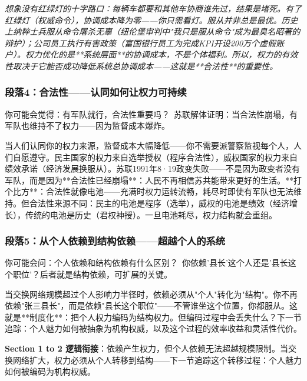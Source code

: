 \documentclass[a4paper,12pt]{book}
\newenvironment{motivation}{\begin{tcolorbox}[colback=gray!10,colframe=gray!60,title=\textit{本章动机},fonttitle=\bfseries,arc=0mm,leftrule=3mm]\small\itshape}{\end{tcolorbox}}
\begin{document}
\begin{motivation}
\begin{motivation}
\begin{motivation}
想象没有红绿灯的十字路口：每辆车都要和其他车协商谁先过，结果是堵死。有了红绿灯（权威命令），协调成本降为零——你只需看灯。服从并非总是最优。历史上纳粹士兵服从命令屠杀无辜（纽伦堡审判中"我只是服从命令"成为最臭名昭著的辩护）；公司员工执行有害政策（富国银行员工为完成KPI开设200万个虚假账户）。权力优化的是**系统层面**的协调成本，不是个体福利。所以，权力的有效性取决于它能否成功降低系统总协调成本——这就是**合法性**的重要性。

	\subsubsection*{段落4：合法性——认同如何让权力可持续}

	\begin{tcolorbox}[colback=yellow!5, title=\textit{读者行为预测}]
		你可能会觉得：有军队就行，合法性重要吗？\ 苏联解体证明：当合法性崩塌，有军队也维持不了权力——因为监督成本爆炸。
	\end{tcolorbox}

当人们认同你的权力来源，监督成本大幅降低——你不需要派警察监视每个人，人们自愿遵守。民主国家的权力来自选举授权（程序合法性），威权国家的权力来自绩效承诺（经济发展换服从）。苏联1991年8·19政变失败——不是因为政变者没有军队，而是因为**合法性已经崩塌**：人民不再相信苏共能带来更好的生活。**打个比方**：合法性就像电池——充满时权力运转流畅，耗尽时即使有军队也无法维持。但合法性来源不同：民主的电池是程序（选举），威权的电池是绩效（经济增长），传统的电池是历史（君权神授）。一旦电池耗尽，权力结构就会重组。

	\subsubsection*{段落5：从个人依赖到结构依赖——超越个人的系统}

	\begin{tcolorbox}[colback=yellow!5, title=\textit{读者行为预测}]
		你可能会问：个人依赖和结构依赖有什么区别？\ 你依赖'县长'这个人还是'县长这个职位'？后者就是结构依赖，可扩展的关键。
	\end{tcolorbox}

当交换网络规模超过个人影响力半径时，依赖必须从"个人"转化为"结构"。你不再依赖"张三县长"，而是依赖"县长这个职位"——不管谁坐这个位置，你都服从。这就是**制度化**：把个人权力编码为结构权力。但编码过程中会丢失什么？下一节追踪：个人魅力如何被抽象为机构权威，以及这个过程的效率收益和灵活性代价。

	\textbf{Section 1 to 2 逻辑衔接}：依赖产生权力，但个人依赖无法超越规模限制。当交换网络扩大，权力必须从个人转移到结构——下一节追踪这个转移过程：个人魅力如何被编码为机构权威。

\end{motivation}
\end{motivation}
\end{motivation}
\end{document}
